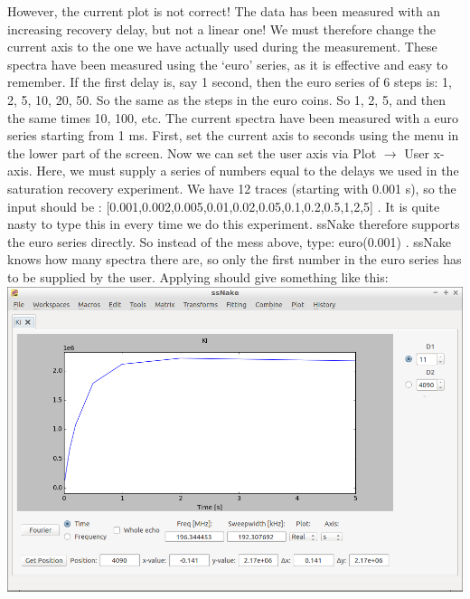 \documentclass[11pt,a4paper]{article}
\begin{document}
However, the  current plot is not correct! The data has been measured with an increasing recovery delay, but not a linear one! We must therefore change the current axis to the one we have actually used during the measurement. These spectra have been measured using the `euro' series, as it is effective and easy to remember. If the first delay is, say 1 second, then the euro series of 6 steps is: 1, 2, 5, 10, 20, 50. So the same as the steps in the euro coins. So 1, 2, 5, and then the same times 10, 100, etc. The current spectra have been measured with a euro series starting from 1 ms. First, set the current axis to seconds using the menu in the lower part of the screen. Now we can set the user axis via Plot $\rightarrow$ User x-axis. Here, we must supply a series of numbers equal to the delays we used in the saturation recovery experiment. We have 12 traces (starting with 0.001 s), so the input should be : [0.001,0.002,0.005,0.01,0.02,0.05,0.1,0.2,0.5,1,2,5] . It is quite nasty to type this in every time we do this experiment. ssNake therefore supports the euro series directly. So instead of the mess above, type: euro(0.001) . ssNake knows how many spectra there are, so only the first number in the euro series has to be supplied by the user. Applying should give something like this:\\
\includegraphics[width=\linewidth]{Images/T1correctAxis.png}
\end{document}
